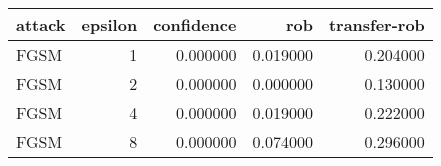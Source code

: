 \begin{tabular}{lrrrr}
\toprule
attack & epsilon & confidence & rob & transfer-rob \\
\midrule
FGSM & 1 & 0.000000 & 0.019000 & 0.204000 \\
FGSM & 2 & 0.000000 & 0.000000 & 0.130000 \\
FGSM & 4 & 0.000000 & 0.019000 & 0.222000 \\
FGSM & 8 & 0.000000 & 0.074000 & 0.296000 \\
\bottomrule
\end{tabular}
